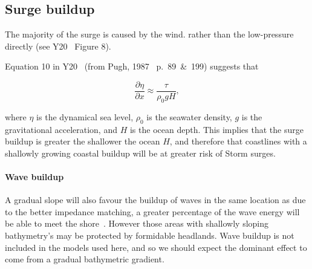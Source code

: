 \subsection{Surge buildup}

The majority of the surge is caused by the wind. rather than the low-pressure directly
(see Y20~\cite{ZannaPreprint} Figure 8).

Equation 10 in Y20~\cite{ZannaPreprint} (from Pugh, 1987~\cite{pugh1987tides} p.~89~\&~199) suggests that

\begin{equation}
\frac{\partial \eta}{\partial x} \approx \frac{\tau}{\rho_{0} g H},
\end{equation}

where $\eta$ is the dynamical sea level, $\rho_0$ is the seawater density,
$g$ is the gravitational acceleration, and $H$ is the ocean depth.
This implies that the surge buildup is greater the shallower the ocean $H$,
and therefore that coastlines with a shallowly growing coastal buildup will
be at greater risk of Storm surges.

\paragraph{Wave buildup}

A gradual slope will also favour the buildup of waves in the same location as due to
the better impedance matching, a greater percentage of the wave energy will be able to
meet the shore~\cite{pugh1987tides}. However those areas with shallowly sloping
bathymetry's may be protected by formidable headlands. Wave buildup is not included
in the models used here, and so we should expect the dominant effect to come from
a gradual bathymetric gradient.
